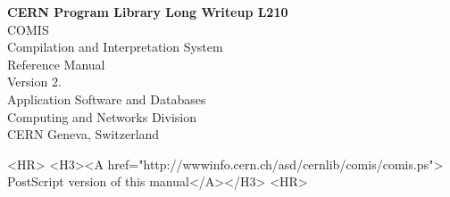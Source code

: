 \begin{htmlonly}
\begin{center}{\Large\bf CERN Program Library Long Writeup L210}\\[5mm]
{\Huge COMIS}\\[5mm]
{\Large Compilation and Interpretation System}\\[5mm]
{\LARGE Reference Manual}\\[5mm]
{\LARGE Version 2.}\\[5mm]
{\Large Application Software and Databases}\\[1cm]
{\Large Computing and Networks Division}\\[5mm]
{\Large CERN Geneva, Switzerland}\\[5mm]
\end{center}

\begin{rawhtml}
<HR>
<H3><A href="http://wwwinfo.cern.ch/asd/cernlib/comis/comis.ps">
PostScript version of this manual</A></H3>
<HR>
\end{rawhtml}

\begin{htmlonly}

\end{htmlonly}
\end{htmlonly}
